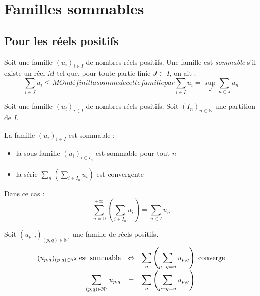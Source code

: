 \documentclass[11pt,a4paper,fleqn,pdftex]{report}
\begin{document}
\section{Familles sommables} %
\label{sec:familles_sommables}
\subsection{Pour les réels positifs} %
\label{sub:pour_les_reels_positifs}
\begin{dfn}
     Soit une famille $(u_i)_{i\in I}$ de nombres réels positifs. Une famille est \emph{sommable} s'il existe un réel $M$ tel que, pour toute partie finie $J \subset I $, on ait :
     \begin{subequations}
     \begin{equation}
     \sum_{i \in J} u_i \le M
     \end{equation}
     On définit la somme de cette famille par
     \begin{equation}
     \sum_{i\in I} u_i = \sup_J \sum_{n\in J} u_n
     \end{equation}
     \end{subequations}
\end{dfn}
\begin{theorem}
     Soit une famille $(u_i)_{i\in I}$ de nombres réels positifs.\newline
     Soit $(I_n)_{n\in\mathbb{N}}$ une partition  de $I$.\par
     La famille $(u_i)_{i\in I}$ est sommable  :
     \begin{itemize}
         \item la sous-famille $(u_i)_{i\in I_n}$ est sommable pour tout $n$
         \item la série $\sum_n \left( \sum_{i\in I_n} u_i \right)$ est convergente
     \end{itemize}
     Dans ce cas : 
     \begin{equation}
     \sum_{n=0}^{+\infty} \left( \sum_{i\in I_n} u_i \right) = \sum_{n\in I} u_n
     \end{equation}
\end{theorem}
\begin{theorem}
     Soit $(u_{p,q})_{(p,q)\in \mathbb{N}^2}$ une famille de réels positifs.\newline
     \begin{equation}
          \begin{array}{r c l}
               (u_{p,q})_{(p,q)\in \mathbb{N}^2} \text{ est sommable} & \Leftrightarrow & \displaystyle\sum_n \left( \displaystyle\sum_{p+q = n} u_{p,q} \right)\text{ converge} \\
               \displaystyle\sum_{(p,q)\in \mathbb{N}^2} u_{p,q} & = & \displaystyle\sum_n \left( \displaystyle\sum_{p+q = n} u_{p,q} \right) \\
          \end{array}
     \end{equation}
\end{theorem}
\end{document}
